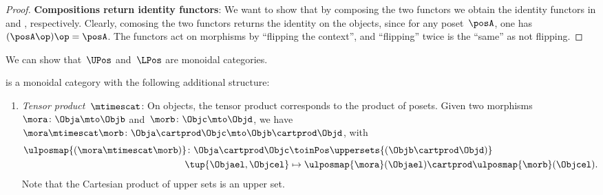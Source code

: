 \begin{proof}
    \textbf{Compositions return identity functors}:
    We want to show that by composing the two functors we obtain the identity functors in \UPos and \LPos, respectively.
    Clearly, comosing the two functors returns the identity on the objects, since for any poset~$\posA$, one has~$(\posA\op)\op=\posA$.
    The functors act on morphisms by ``flipping the context'', and ``flipping'' twice is the ``same'' as not flipping.
\end{proof}

We can show that~$\UPos$ and~$\LPos$ are monoidal categories.

\begin{lemma}
    \label{lem:upos_moncat}
    \UPos is a monoidal category with the following additional structure:
    \begin{enumerate}
        \item \emph{Tensor product~$\mtimescat$}: On objects, the tensor product corresponds to the product of posets.
              Given two morphisms~$\mora\colon \Obja\mto \Objb$ and~$\morb\colon \Objc\mto \Objd$, we have~$\mora \mtimescat \morb\colon  \Obja \cartprod \Objc \mto \Objb\cartprod \Objd$, with
              \begin{equation}
                  \begin{aligned}
                      \ulposmap{(\mora\mtimescat \morb)}\colon \Obja \cartprod \Objc & \toinPos \uppersets{(\Objb\cartprod \Objd)}                           \\
                      \tup{\Objael,\Objcel}                                          & \mapsto \ulposmap{\mora}(\Objael)\cartprod \ulposmap{\morb}(\Objcel).
                  \end{aligned}
              \end{equation}
              Note that the Cartesian product of upper sets is an upper set.


\end{enumerate}
\end{lemma}
